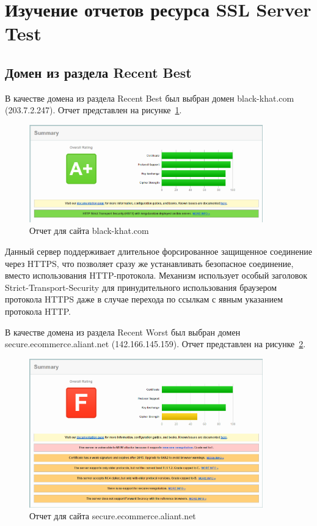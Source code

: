 \documentclass[10pt,a4paper]{report}
\begin{document}
	\section{Изучение отчетов ресурса SSL Server Test}
		\subsection{Домен из раздела Recent Best}
			В качестве домена из раздела Recent Best был выбран домен black-khat.com (203.7.2.247).
			Отчет представлен на рисунке~\ref{ris:site1}.

			\begin{figure}[h]
				\centering
				\includegraphics[width=0.9\textwidth]{imgs/1.png}
				\caption{Отчет для сайта black-khat.com}
				\label{ris:site1}
			\end{figure}

		Данный сервер поддерживает длительное форсированное защищенное соединение через HTTPS, что позволяет сразу же устанавливать безопасное соединение, вместо использования HTTP-протокола. Механизм использует особый заголовок Strict-Transport-Security для принудительного использования браузером протокола HTTPS даже в случае перехода по ссылкам с явным указанием протокола HTTP. 
			
			В качестве домена из раздела Recent Worst был выбран домен 
secure.ecommerce.aliant.net (142.166.145.159).
			Отчет представлен на рисунке~\ref{ris:site2}.

			\begin{figure}[h]
				\centering
				\includegraphics[width=0.9\textwidth]{imgs/2.png}
				\caption{Отчет для сайта secure.ecommerce.aliant.net}
				\label{ris:site2}
			\end{figure}
	
\end{document}
